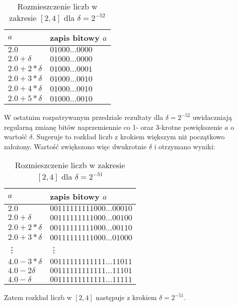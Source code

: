 \documentclass{classrep}
\begin{document}
\begin{enumerate}
		\begin{table}[!h]
        		\centering
            	\begin{tabular}{ll} \toprule
                	$a$ & {zapis bitowy $a$} \\ \midrule
                	$2.0$ & $01000\dots0000$ \\ 
 					$2.0+\delta$ & $01000\dots0000$ \\
 					$2.0+2*\delta$ & $01000\dots0001$ \\
 					$2.0+3*\delta$ & $01000\dots0010$ \\
 					$2.0+4*\delta$ & $01000\dots0010$ \\
 					$2.0+5*\delta$ & $01000\dots0010$ \\\bottomrule
            	\end{tabular}
            	\caption{Rozmieszczenie liczb w zakresie $[2,4]$ dla $\delta = 2^{-52}$}
				\label{table:7}
   			\end{table}
   			W ostatnim rozpatrywanym przedziale rezultaty dla $\delta = 2^{-52}$ uwidaczniają regularną zmianę bitów 
   			naprzemiennie co 1- oraz 3-krotne powiększenie $a$ o wartość $\delta$. Sugeruje to rozkład liczb z krokiem 
   			większym niż początkowo założony. Wartość zwiększono więc dwukrotnie $\delta$ i otrzymano wyniki:
  
   			\begin{table}[!h]
        		\centering
            	\begin{tabular}{ll} \toprule
                	$a$ & {zapis bitowy $a$} \\ \midrule
                	$2.0$ & $00111111111000\dots00010$ \\ 
 					$2.0+\delta$ & $00111111111000\dots00100$ \\
 					$2.0+2*\delta$ & $00111111111000\dots00110$ \\
 					$2.0+3*\delta$ & $00111111111000\dots01000$  \\
 					\vdots & \vdots \\
 					$4.0-3*\delta$ & $00111111111111\dots11011$ \\
 					$4.0-2\delta$ & $00111111111111\dots11101$ \\
 					$4.0-\delta$ & $00111111111111\dots11111$ \\\bottomrule
            	\end{tabular}
            	\caption{Rozmieszczenie liczb w zakresie $[2,4]$ dla $\delta = 2^{-51}$}
			\label{table:8}
   			\end{table}
   			Zatem rozkład liczb w $[2,4]$ następuje z krokiem $\delta = 2^{-51}$.
   			
		\end{enumerate}
\end{document}

